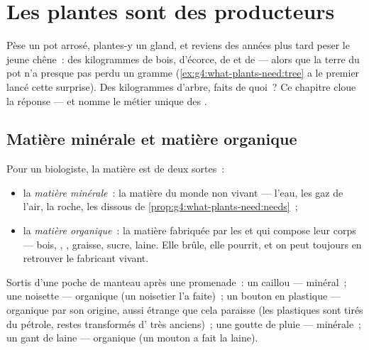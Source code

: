 \chapter{Les plantes sont des producteurs}\label{ch:g6:plants-are-producers}

Pèse un pot arrosé, plantes-y un gland, et reviens des années plus
tard peser le jeune chêne~: des kilogrammes de bois, d'écorce, de
 et de  --- alors que la terre du pot n'a presque pas
perdu un gramme (\cref{ex:g4:what-plants-need:tree} a le premier
lancé cette surprise). Des kilogrammes d'arbre, faits de quoi~? Ce
chapitre cloue la réponse --- et nomme le métier unique des .

\section{Matière minérale et matière organique}

\begin{definition}\label{def:g6:plants-are-producers:matter}
Pour un biologiste, la matière est de deux sortes~:
\begin{itemize}
  \item la \emph{matière minérale}~: la
        matière du monde non vivant --- l'eau, les gaz de l'air, la
        roche, les  dissous de
        \cref{prop:g4:what-plants-need:needs}~;
  \item la \emph{matière organique}~: la
        matière fabriquée par les  et qui compose leur
        corps --- bois, , , graisse, sucre, laine. Elle
        brûle, elle pourrit, et on peut toujours en retrouver le
        fabricant vivant.
\end{itemize}
\end{definition}

\begin{example}\label{ex:g6:plants-are-producers:sorting}
Sortis d'une poche de manteau après une promenade~: un caillou ---
minéral~; une noisette --- organique (un noisetier l'a faite)~; un
bouton en plastique --- organique par son origine, aussi étrange que
cela paraisse (les plastiques sont tirés du pétrole, restes
transformés d' très anciens)~; une goutte de pluie ---
minérale~; un gant de laine --- organique (un mouton a fait la
laine).
\end{example}

